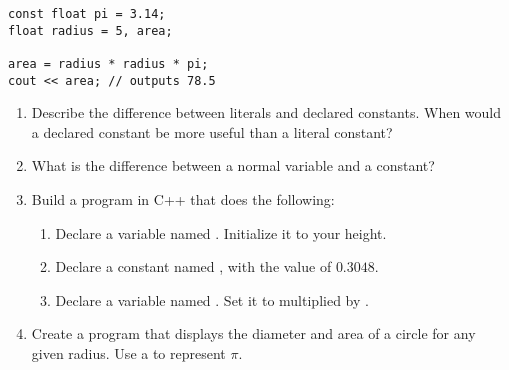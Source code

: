 \noindent\begin{minipage}{\linewidth}\begin{lstlisting}
const float pi = 3.14;
float radius = 5, area;

area = radius * radius * pi;
cout << area; // outputs 78.5
\end{lstlisting}\end{minipage}


\begin{enumerate}
	\item Describe the difference between literals and declared constants. 
	When would a declared constant be more useful than a literal constant?
	\item What is the difference between a normal variable and a constant?
	\item Build a program in C++ that does the following:
	
	\begin{enumerate}
		\item Declare a  variable named . Initialize it to your height.
		\item Declare a  constant named , with the value of $0.3048$.
		\item Declare a  variable named . Set it to  multiplied by .
	\end{enumerate}

	\item Create a program that displays the diameter and area of a circle for any given radius. Use a  to represent $\pi$. 

\end{enumerate}


